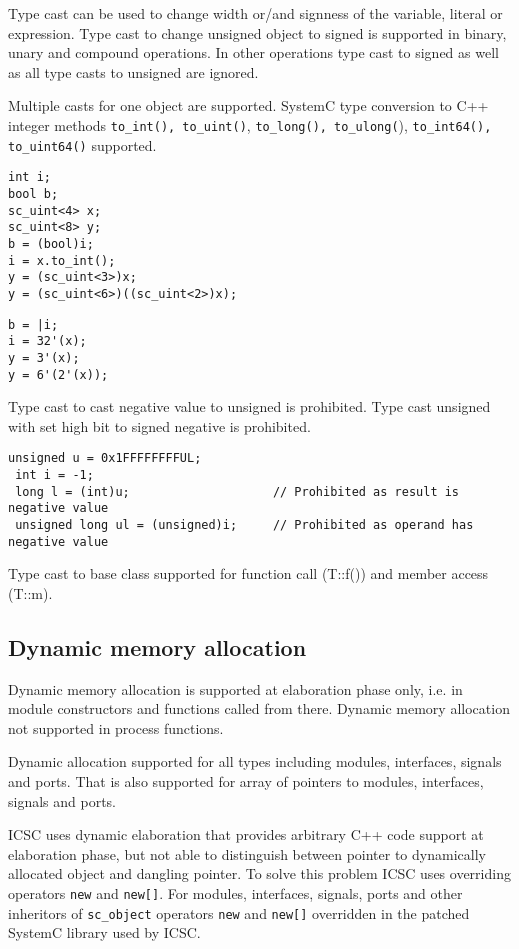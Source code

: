 Type cast can be used to change width or/and signness of the variable, literal or expression. 
Type cast to change unsigned object to signed is supported in binary, unary and compound operations. In other operations type cast to signed as well as all type casts to unsigned are ignored. 

Multiple casts for one object are supported. 
SystemC type conversion to C++ integer methods {\tt to\_int(), to\_uint()}, {\tt to\_long(), to\_ulong(}), {\tt to\_int64(), to\_uint64()} supported. 
%
\begin{lstlisting}[style=mycpp]
int i;
bool b;
sc_uint<4> x;
sc_uint<8> y;
b = (bool)i; 
i = x.to_int();
y = (sc_uint<3>)x;
y = (sc_uint<6>)((sc_uint<2>)x);
\end{lstlisting}
%
\begin{lstlisting}[style=myverilog]
b = |i;
i = 32'(x);
y = 3'(x);
y = 6'(2'(x));
\end{lstlisting}

Type cast to cast negative value to unsigned is prohibited. Type cast unsigned with set high bit to signed negative is prohibited.
%
\begin{lstlisting}[style=mycpp]
 unsigned u = 0x1FFFFFFFFUL;
 int i = -1;
 long l = (int)u;                    // Prohibited as result is negative value
 unsigned long ul = (unsigned)i;     // Prohibited as operand has negative value
\end{lstlisting}

Type cast to base class supported for function call (T::f()) and member access (T::m).


\subsection{Dynamic memory allocation}

Dynamic memory allocation is supported at elaboration phase only, i.e. in module constructors and functions called from there. Dynamic memory allocation not supported in process functions.

Dynamic allocation supported for all types including modules, interfaces, signals and ports. That is also supported for array of pointers to modules, interfaces, signals and ports.

ICSC uses dynamic elaboration that provides arbitrary C++ code support at elaboration phase, but not able to distinguish between pointer to dynamically allocated object and dangling pointer. To solve this problem ICSC uses overriding operators {\tt new} and {\tt new[]}. For modules, interfaces, signals, ports and other inheritors of {\tt sc\_object} operators {\tt new} and {\tt new[]} overridden in the patched SystemC library used by ICSC. 

